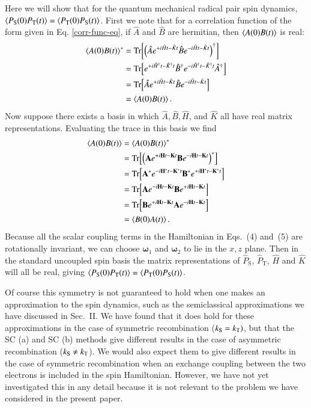 \documentclass[%
aip,
jcp,%
amsmath,amssymb,
reprint%
]{revtex4-1}
\newcommand{\sing}{\ensuremath{\mathrm{S}}}
\newcommand{\trip}{\ensuremath{\mathrm{T}}}
\renewcommand{\op}[1]{\ensuremath{\hat{#1}}}
\begin{document}
Here we will show that for the quantum mechanical radical pair spin dynamics, $\ev{P_\sing(0)P_\trip(t)}=\ev{P_\trip(0)P_\sing(t)}$. First we note that for a correlation function of the form given in Eq. \eqref{corr-func-eq}, if $\op{A}$ and $\op{B}$ are hermitian, then $\ev{A(0)B(t)}$ is real:
\begin{align}
  \begin{split}
    \ev{A(0)B(t)}^* &= \Tr[\left(\op{A}e^{+i\op{H}t-\op{K}t}\op{B}e^{-i\op{H}t-\op{K}t}\right)^\dag] \\
    &=\Tr[e^{+i\op{H}^\dag t-\op{K}^\dag t}\op{B}^\dag e^{-i\op{H}^\dag t-\op{K}^\dag t}\op{A}^\dag] \\
    &= \Tr[\op{A}e^{+i\op{H}t-\op{K}t}\op{B}e^{-i\op{H}t-\op{K}t}] \\
    &= \ev{A(0)B(t)}.
  \end{split}
\end{align}
Now suppose there exists a basis in which $\op{A}, \op{B}, \op{H}$, and $\op{K}$ all have real matrix representations. Evaluating the trace in this basis we find
\begin{align}
  \begin{split}
    \ev{A(0)B(t)} &= \ev{A(0)B(t)}^* \\
  &=  \Tr[\left(\vb{A}e^{+i\vb{H}t-\vb{K}t}\vb{B}e^{-i\vb{H}t-\vb{K}t}\right)^*] \\
  &=  \Tr[\vb{A}^*e^{-i\vb{H}^*t-\vb{K}^*t}\vb{B}^*e^{+i\vb{H}^*t-\vb{K}^*t}] \\
  &=  \Tr[\vb{A}e^{-i\vb{H}t-\vb{K}t}\vb{B}e^{+i\vb{H}t-\vb{K}t}] \\
  &=  \Tr[\vb{B}e^{+i\vb{H}t-\vb{K}t}\vb{A}e^{-i\vb{H}t-\vb{K}t}] \\
  &= \ev{B(0)A(t)}.
  \end{split}
\end{align}
Because all the scalar coupling terms in the Hamiltonian in Eqs.~(4) and~(5) are rotationally invariant, we can choose $\boldsymbol{\omega}_1$ and $\boldsymbol{\omega}_2$ to lie in the $x,z$ plane. Then in the standard uncoupled spin basis the matrix representations of $\op{P}_\sing$, $\op{P}_\trip$, $\op{H}$ and $\op{K}$ will all be real, giving $\ev{P_\sing(0)P_\trip(t)}=\ev{P_\trip(0)P_\sing(t)}$.

Of course this symmetry is not guaranteed to hold when one makes an approximation to the spin dynamics, such as the semiclassical approximations we have discussed in Sec.~II. We have found that it does hold for these approximations in the case of symmetric recombination ($k_{\rm S}=k_{\rm T})$, but that the SC (a) and SC (b) methods give different results in the case of asymmetric recombination ($k_{\rm S}\not=k_{\rm T}$). We would also expect them to give different results in the case of symmetric recombination when an exchange coupling between the two electrons is included in the spin Hamiltonian. However, we have not yet investigated this in any detail because it is not relevant to the problem we have considered in the present paper.
\end{document}
